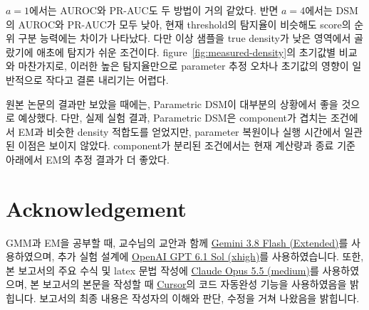 \documentclass[a4paper,11pt]{article}
\numberwithin{equation}{section}
\begin{document}
$a=1$에서는 AUROC와 PR-AUC도 두 방법이 거의 같았다.
반면 $a=4$에서는 DSM의 AUROC와 PR-AUC가 모두 낮아,
현재 threshold의 탐지율이 비슷해도 score의 순위 구분 능력에는 차이가 나타났다.
다만 이상 샘플을 true density가 낮은 영역에서 골랐기에 애초에 탐지가 쉬운 조건이다.
figure~\ref{fig:measured-density}의 초기값별 비교와 마찬가지로,
이러한 높은 탐지율만으로 parameter 추정 오차나 초기값의 영향이 일반적으로 작다고 결론 내리기는 어렵다.

원본 논문의 결과만 보았을 때에는, Parametric DSM이 대부분의 상황에서 좋을 것으로 예상했다. 다만, 실제 실험 결과,
Parametric DSM은 component가 겹치는 조건에서 EM과 비슷한 density 적합도를 얻었지만,
parameter 복원이나 실행 시간에서 일관된 이점은 보이지 않았다.
component가 분리된 조건에서는 현재 계산량과 종료 기준 아래에서 EM의 추정 결과가 더 좋았다.

\section*{Acknowledgement}
GMM과 EM을 공부할 때, 교수님의 교안과 함께 \href{https://blog.google/innovation-and-ai/models-and-research/gemini-models/3-8-flash-and-3-8-flash-cyber/}{Gemini 3.8 Flash (Extended)}를 사용하였으며, 추가 실험 설계에 \href{https://openai.com/index/introducing-gpt-6-1-sol/}{OpenAI GPT 6.1 Sol (xhigh)}를 사용하였습니다. 또한, 본 보고서의 주요 수식 및 latex 문법 작성에 \href{https://www.anthropic.com/claude-opus-5-5}{Claude Opus 5.5 (medium)}를 사용하였으며, 본 보고서의 본문을 작성할 때 \href{https://cursor.com/help/ai-features/tab}{Cursor}의 코드 자동완성 기능을 사용하였음을 밝힙니다.
보고서의 최종 내용은 작성자의 이해와 판단, 수정을 거쳐 나왔음을 밝힙니다.
\end{document}
